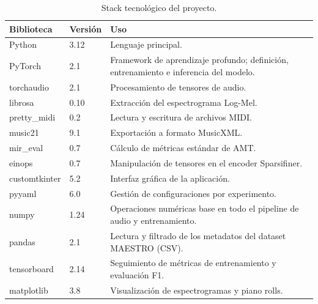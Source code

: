 \begin{table}[H]
      \centering
      \renewcommand{\arraystretch}{1.2}
      \begin{tabular}{l l p{7cm}}
          \hline
          \textbf{Biblioteca} & \textbf{Versión} & \textbf{Uso} \\
          \hline
          Python          & 3.12  & Lenguaje principal. \\
          PyTorch         & 2.1   & Framework de aprendizaje profundo;
                                    definición, entrenamiento e inferencia
                                    del modelo. \\
          torchaudio      & 2.1   & Procesamiento de tensores de audio. \\
          librosa         & 0.10  & Extracción del espectrograma Log-Mel. \\
          pretty\_midi    & 0.2   & Lectura y escritura de archivos MIDI. \\
          music21         & 9.1   & Exportación a formato MusicXML. \\
          mir\_eval       & 0.7   & Cálculo de métricas estándar de AMT. \\
          einops          & 0.7   & Manipulación de tensores en el encoder
                                    Sparsifiner. \\
          customtkinter   & 5.2   & Interfaz gráfica de la aplicación. \\
          pyyaml          & 6.0   & Gestión de configuraciones por
                                    experimento. \\
          numpy           & 1.24  & Operaciones numéricas base en todo
                                    el pipeline de audio y entrenamiento. \\
          pandas          & 2.1   & Lectura y filtrado de los metadatos
                                    del dataset MAESTRO (CSV). \\
          tensorboard     & 2.14  & Seguimiento de métricas de
                                    entrenamiento y evaluación F1. \\
          matplotlib      & 3.8   & Visualización de espectrogramas
                                    y piano rolls. \\
          \hline
      \end{tabular}
      \caption{Stack tecnológico del proyecto.}
      \label{tab:stack_tecnologico}
  \end{table}

